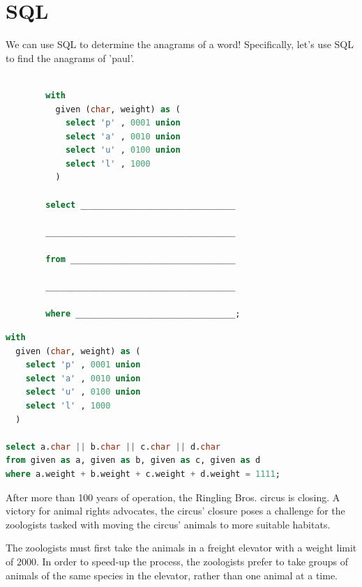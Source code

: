 \documentclass{exam}
\begin{document}
\section{SQL}
\begin{questions}

\item We can use SQL to determine the anagrams of a word! Specifically, let’s use SQL to find the anagrams of 'paul'.

\begin{lstlisting}[language=SQL]

        with
          given (char, weight) as (
            select 'p' , 0001 union
            select 'a' , 0010 union
            select 'u' , 0100 union
            select 'l' , 1000
          )

        select _______________________________ 

        ______________________________________

        from _________________________________ 

        ______________________________________ 

        where ________________________________;

\end{lstlisting}

\begin{solution}
\begin{lstlisting}[language=SQL]
with
  given (char, weight) as (
    select 'p' , 0001 union
    select 'a' , 0010 union
    select 'u' , 0100 union
    select 'l' , 1000
  )

select a.char || b.char || c.char || d.char 
from given as a, given as b, given as c, given as d 
where a.weight + b.weight + c.weight + d.weight = 1111;
\end{lstlisting}
\end{solution}

\clearpage

\item After more than 100 years of operation, the Ringling Bros. circus is closing.  A victory for animal rights advocates, the circus’ closure poses a challenge for the zoologists tasked with moving the circus’ animals to more suitable habitats.
 
The zoologists must first take the animals in a freight elevator with a weight limit of 2000.  In order to speed-up the process, the zoologists prefer to take groups of animals of the same species in the elevator, rather than one animal at a time.  


\end{questions}
\end{document}
